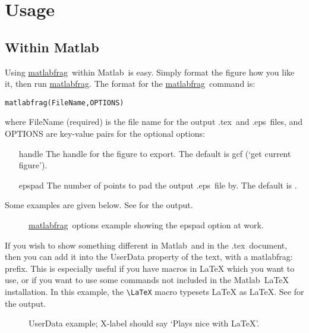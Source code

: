 \documentclass[a4paper,11pt]{article}
\newcommand\matlabfrag{\texorpdfstring{\href{http://www.mathworks.com/matlabcentral/fileexchange/21286}{{\ttfamily matlabfrag}}}{matlabfrag}}
\newcommand\matlab{\texorpdfstring{{\sc Matlab}}{Matlab}}
\newcommand\tex{\texorpdfstring{{\sc .tex}}{.tex}}
\newcommand\eps{\texorpdfstring{{\sc .eps}}{.eps}}
\def\'#1'{{\ttfamily \textquotesingle #1\textquotesingle}}
\begin{document}
  \section{Usage}%
    \subsection{Within \matlab}%
      Using \matlabfrag\ within \matlab\ is easy. Simply format the figure how you like it, then run
      \matlabfrag. The format for the \matlabfrag\ command is:
      \begin{verbatim}
matlabfrag(FileName,OPTIONS)
      \end{verbatim}
      where {\ttfamily FileName} (required) is the file name for the output \tex\ and \eps\ files, and 
      {\ttfamily OPTIONS} are key-value pairs for the optional options:
      \begin{itemize}
        \item[{\'handle'}] The handle for the figure to export. The default is {\ttfamily gcf} (`get 
		  current figure').
        \item[{\'epspad'}] The number of points to pad the output \eps\ file by. The default is {\ttfamily [0,0,0,0]}.
      \end{itemize}
      Some examples are given below.\nobreak
      See  for the output.
      \begin{figure}[ht]
        \centering
        \quad
        \caption{\matlabfrag\ options example showing the {\ttfamily epspad} option at work.}
      \end{figure}
      
      If you wish to show something different in \matlab\ and in the \tex\ document, then you
      can add it into the {\ttfamily UserData} property of the text, with a {\ttfamily matlabfrag:} prefix. This is
      especially useful if you have macros in LaTeX which you want to use, or if you want to use some
      commands not included in the \matlab\ LaTeX installation. In this example, the \verb|\LaTeX| macro
      typesets LaTeX as \LaTeX.
      See  for the output.
      \begin{figure}[ht]
        \centering
        \caption{UserData example; X-label should say `Plays nice with \LaTeX'.}
      \end{figure}
      
\end{document}
